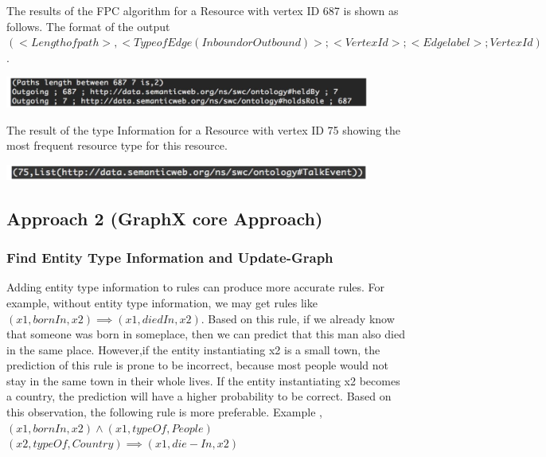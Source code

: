 \documentclass{easychair}
\begin{document}
The results of the FPC algorithm for a Resource with vertex ID 687 is shown as follows. The format of the output  $(<Length of path>, <Type of Edge (Inbound or Outbound )> ; <VertexId> ; <Edge label>; VertexId)$.

\includegraphics[width=0.9\textwidth]{Fpc.png}

The result of the type Information for a Resource with vertex ID 75 showing the most frequent resource type for this resource.

\includegraphics[width=0.9\textwidth]{typeinfo.png}


\subsection{Approach 2 (GraphX core  Approach)}

\subsubsection{Find Entity Type Information and Update-Graph}
Adding entity type information to rules can produce more accurate rules. For example, without entity type information, we may get rules like $(x1, bornIn, x2) \implies (x1, diedIn, x2)$. Based on this rule, if we already know that someone was born in someplace, then we can predict that this man also died in the same place. However,if the entity instantiating x2 is a small town, the prediction of this rule is prone to be incorrect, because most people would not stay in the same town in their whole lives. If the entity instantiating x2 becomes a country, the prediction will have a higher probability to be correct. Based on this observation, the following rule is more preferable.
Example , $(x1, bornIn, x2) \land (x1, typeOf, People)$ \\
$(x2, typeOf,Country) \implies (x1, die-In, x2)$
\end{document}
